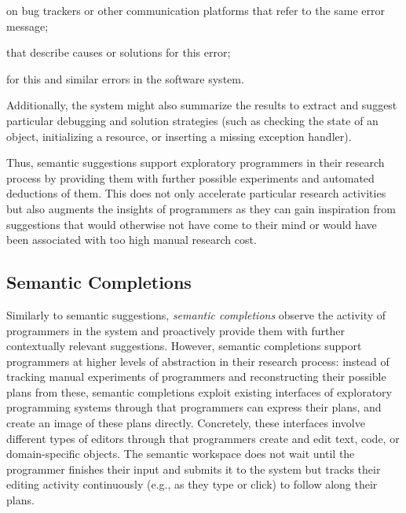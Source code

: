 	\begin{description}[noextralabelsep]
		\item[bug reports] on bug trackers or other communication platforms that refer to the same error message;
		\item[documentation artifacts] that describe causes or solutions for this error;
		\item[exception handlers] for this and similar errors in the software system.
	\end{description}

	\noindent
	Additionally, the system might also summarize the results to extract and suggest particular debugging and solution strategies (such as checking the state of an object, initializing a resource, or inserting a missing exception handler).


\ParSep

Thus, semantic suggestions support exploratory programmers in their research process by providing them with further possible experiments and automated deductions of them.
This does not only accelerate particular research activities but also augments the insights of programmers as they can gain inspiration from suggestions that would otherwise not have come to their mind or would have been associated with too high manual research cost.

\subsection{Semantic Completions}
\label{sec:approach/workspace/completions}

Similarly to semantic suggestions, \emph{semantic completions} observe the activity of programmers in the system and proactively provide them with further contextually relevant suggestions.
However, semantic completions support programmers at higher levels of abstraction in their research process:
instead of tracking manual experiments of programmers and reconstructing their possible plans from these, semantic completions exploit existing interfaces of exploratory programming systems through that programmers can express their plans, and create an image of these plans directly.
Concretely, these interfaces involve different types of editors through that programmers create and edit text, code, or domain-specific objects.
The semantic workspace does not wait until the programmer finishes their input and submits it to the system but tracks their editing activity continuously (e.g., as they type or click) to follow along their plans.

